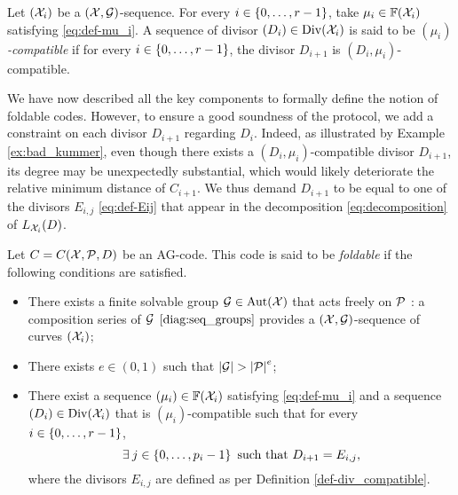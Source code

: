\documentclass[10pt]{article}
\begin{document}
\begin{definition}[$(\mu_i)$-compatibility]\label{def-mu_i_compatible}
	Let $(\mathcal{X}_i)$ be a $(\mathcal{X},\mathcal{G})$-sequence. For every $i \in \left\{0,\dots,r-1\right\}$, take $\mu_i \in \mathbb{F}(\mathcal{X}_i)$ satisfying \eqref{eq:def-mu_i}. A sequence of divisor $(D_i) \in \operatorname{Div}(\mathcal{X}_i)$ is said to be \emph{$(\mu_i)$-compatible} if for every $i \in \left\{0,\dots,r-1\right\}$, the divisor $D_{i+1}$ is $(D_i,\mu_i)$-compatible.
\end{definition}

We have now described all the key components to formally define the notion of foldable codes. However, to ensure a good soundness of the protocol, we add a constraint on each divisor $D_{i+1}$ regarding $D_i$. Indeed, as illustrated by Example \ref{ex:bad_kummer}, even though there exists a $(D_i,\mu_i)$-compatible divisor $D_{i+1}$, its degree may be unexpectedly substantial, which would likely deteriorate the relative minimum distance of $C_{i+1}$. We thus demand $D_{i+1}$ to be equal to one of the divisors $E_{i,j}$ \eqref{eq:def-Eij} that appear in the decomposition \eqref{eq:decomposition} of $L_{\mathcal{X}_i}(D)$.


\begin{definition}\label{def:good_properties}
	Let $C =C(\mathcal{X},\mathcal{P},D)$ be an AG-code. This code is said to be \emph{foldable} if the following conditions are satisfied.
	\begin{itemize}
		\item There exists a finite solvable group $\mathcal{G} \in \operatorname{Aut}(\mathcal{X})$ that acts freely on $\mathcal{P}$ : a composition series of $\mathcal{G}$ $\eqref{diag:seq_groups}$ provides a $(\mathcal{X},\mathcal{G})$-sequence of curves $(\mathcal{X}_i)$;
		\item There exists $e \in (0,1)$ such that $\left|\mathcal{G}\right| > \left|\mathcal{P}\right|^e$;
		\item There exist a sequence $(\mu_i) \in \mathbb{F}(\mathcal{X}_i)$ satisfying \eqref{eq:def-mu_i} and a sequence $(D_i) \in \operatorname{Div}(\mathcal{X}_i)$ that is $(\mu_i)$-compatible such that for every $i \in \left\{0,\dots,r-1\right\}$,
		\begin{equation}\label{eq:cdt_Di+1}
			\exists \: j \in \left\{0,\dots,p_i-1\right\} \text{ such that } D_{i+1}=E_{i,j},
		\end{equation}
		where the divisors $E_{i, j}$ are defined as per Definition \ref{def-div_compatible}.
		
	\end{itemize}
\end{definition}
\end{document}
